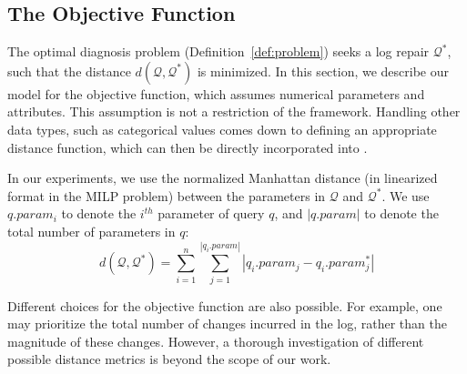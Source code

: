 
\subsection{The Objective Function}

The optimal diagnosis problem (Definition~\ref{def:problem}) seeks a
log repair $\mathcal{Q}^*$, such that the distance
$d(\mathcal{Q},\mathcal{Q}^*)$ is minimized. In this section, we
describe our model for the objective function, which assumes numerical
parameters and attributes. This assumption is not a restriction of the
\sys framework.
Handling other data types, such as categorical values comes down to defining an appropriate distance function, which can then be directly incorporated into \sys.

In our experiments, we use the normalized Manhattan
distance (in linearized format in the MILP problem) 
between the parameters in $\mathcal{Q}$ and
$\mathcal{Q}^*$. We use $q.param_i$ to denote the $i^{th}$ parameter
of query $q$, and $|q.param|$ to denote the total number of parameters
in $q$: \[d(\mathcal{Q}, \mathcal{Q}^*) = \sum_{i = 1} ^{n} \sum_{j =
1}^{|q_i.param|} |q_i.param_j - q_i.param_j^*|\]

Different choices for the objective function are also possible. For
example, one may prioritize the total number of changes incurred in
the log, rather than the magnitude of these changes. However, a
thorough investigation of different possible distance metrics is
beyond the scope of our work.

